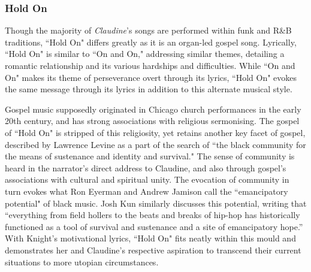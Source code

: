 \subsubsection{Hold On}

Though the majority of \textit{Claudine}'s songs are performed within funk and R\&B traditions, ``Hold On" differs greatly as it is an organ-led gospel song.
Lyrically, ``Hold On" is similar to ``On and On," addressing similar themes, detailing a romantic relationship and its various hardships and difficulties.
While ``On and On" makes its theme of perseverance overt through its lyrics, ``Hold On" evokes the same message through its lyrics in addition to this alternate musical style.

Gospel music supposedly originated in Chicago church performances in the early 20th century, and has strong associations with religious sermonising.\autocite[][63]{burnim_gospel_1980}
The gospel of ``Hold On" is stripped of this religiosity, yet retains another key facet of gospel, described by Lawrence Levine as a part of the search of ``the black community for the means of sustenance and identity and survival."\autocite[][189]{levine_black_1977}
The sense of community is heard in the narrator's direct address to Claudine, and also through gospel's associations with cultural and spiritual unity.
The evocation of community in turn evokes what Ron Eyerman and Andrew Jamison call the ``emancipatory potential" of black music.\autocite[][97]{eyerman_music_1998}
Josh Kun similarly discusses this potential, writing that ``everything from field hollers to the beats and breaks of hip-hop has historically functioned as a tool of survival and sustenance and a site of emancipatory hope.”\autocite[][23-24]{kun_audiotopia_2005}
With Knight's motivational lyrics, ``Hold On" fits neatly within this mould and demonstrates her and Claudine's respective aspiration to transcend their current situations to more utopian circumstances.

